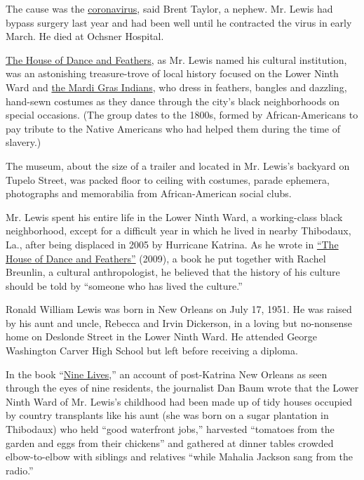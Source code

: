 The cause was the
\href{https://www.nytimes.com/2020/04/13/us/coronavirus-new-orleans-mardi-gras.html}{coronavirus},
said Brent Taylor, a nephew. Mr. Lewis had bypass surgery last year and
had been well until he contracted the virus in early March. He died at
Ochsner Hospital.

\href{houseofdanceandfeathers.org/}{The House of Dance and Feathers}, as
Mr. Lewis named his cultural institution, was an astonishing
treasure-trove of local history focused on the Lower Ninth Ward and
\href{https://www.neworleans.com/things-to-do/music/history-and-traditions/mardi-gras-indians/}{the
Mardi Gras Indians}, who dress in feathers, bangles and dazzling,
hand-sewn costumes as they dance through the city's black neighborhoods
on special occasions. (The group dates to the 1800s, formed by
African-Americans to pay tribute to the Native Americans who had helped
them during the time of slavery.)

The museum, about the size of a trailer and located in Mr. Lewis's
backyard on Tupelo Street, was packed floor to ceiling with costumes,
parade ephemera, photographs and memorabilia from African-American
social clubs.

Mr. Lewis spent his entire life in the Lower Ninth Ward, a working-class
black neighborhood, except for a difficult year in which he lived in
nearby Thibodaux, La., after being displaced in 2005 by Hurricane
Katrina. As he wrote in
\href{https://www.neighborhoodstoryproject.org/product-page/the-house-of-dance-feathers}{``The
House of Dance and Feathers''} (2009), a book he put together with
Rachel Breunlin, a cultural anthropologist, he believed that the history
of his culture should be told by ``someone who has lived the culture.''

Ronald William Lewis was born in New Orleans on July 17, 1951. He was
raised by his aunt and uncle, Rebecca and Irvin Dickerson, in a loving
but no-nonsense home on Deslonde Street in the Lower Ninth Ward. He
attended George Washington Carver High School but left before receiving
a diploma.

In the book
``\href{https://www.nytimes.com/2009/02/18/books/chapters/excerpt-the-nine.html?action=click\&module=RelatedCoverage\&pgtype=Article\&region=Footer}{Nine
Lives},'' an account of post-Katrina New Orleans as seen through the
eyes of nine residents, the journalist Dan Baum wrote that the Lower
Ninth Ward of Mr. Lewis's childhood had been made up of tidy houses
occupied by country transplants like his aunt (she was born on a sugar
plantation in Thibodaux) who held ``good waterfront jobs,'' harvested
``tomatoes from the garden and eggs from their chickens'' and gathered
at dinner tables crowded elbow-to-elbow with siblings and relatives
``while Mahalia Jackson sang from the radio.''

